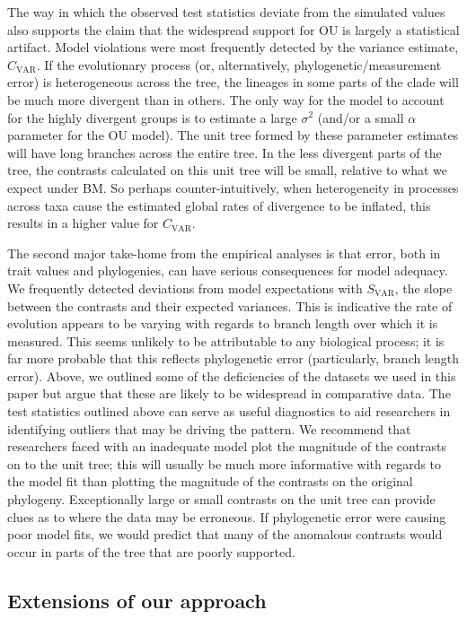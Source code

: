The way in which the observed test statistics deviate from the simulated values also supports the claim that the widespread support for OU is largely a statistical artifact. Model violations were most frequently detected by the variance estimate, $C_{\text{VAR}}$. If the evolutionary process (or, alternatively, phylogenetic/measurement error) is heterogeneous across the tree, the lineages in some parts of the clade will be much more divergent than in others. The only way for the model to account for the highly divergent groups is to estimate a large $\sigma^2$ (and/or a small $\alpha$ parameter for the OU model). The unit tree formed by these parameter estimates will have long branches across the entire tree. In the less divergent parts of the tree, the contrasts calculated on this unit tree will be small, relative to what we expect under BM. So perhaps counter-intuitively, when heterogeneity in processes across taxa cause the estimated global rates of divergence to be inflated, this results in a higher value for $C_{\text{VAR}}$.

The second major take-home from the empirical analyses is that error, both in trait values and phylogenies, can have serious consequences for model adequacy. We frequently detected deviations from model expectations with $S_{\text{VAR}}$, the slope between the contrasts and their expected variances. This is indicative the rate of evolution appears to be varying with regards to branch length over which it is measured. This seems unlikely to be attributable to any biological process; it is far more probable that this reflects phylogenetic error (particularly, branch length error). Above, we outlined some of the deficiencies of the datasets we used in this paper but argue that these are likely to be widespread in comparative data. The test statistics outlined above can serve as useful diagnostics to aid researchers in identifying outliers that may be driving the pattern. We recommend that researchers faced with an inadequate model plot the magnitude of the contrasts on to the unit tree; this will usually be much more informative with regards to the model fit than plotting the magnitude of the contrasts on the original phylogeny. Exceptionally large or small contrasts on the unit tree can provide clues as to where the data may be erroneous. If phylogenetic error were causing poor model fits, we would predict that many of the anomalous contrasts would occur in parts of the tree that are poorly supported.
 
\subsection{Extensions of our approach}

